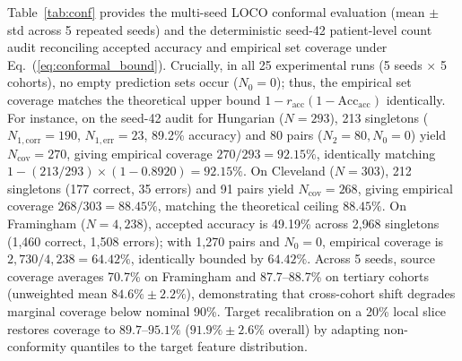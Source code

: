 \documentclass[journal]{IEEEtran}
\begin{document}
Table~\ref{tab:conf} provides the multi-seed LOCO conformal evaluation (mean $\pm$ std across 5 repeated seeds) and the deterministic seed-42 patient-level count audit reconciling accepted accuracy and empirical set coverage under Eq.~(\ref{eq:conformal_bound}). Crucially, in all 25 experimental runs (5 seeds $\times$ 5 cohorts), no empty prediction sets occur ($N_0=0$); thus, the empirical set coverage matches the theoretical upper bound $1 - r_{\mathrm{acc}}(1 - \mathrm{Acc}_{\mathrm{acc}})$ identically. For instance, on the seed-42 audit for Hungarian ($N=293$), 213 singletons ($N_{1,\mathrm{corr}}=190$, $N_{1,\mathrm{err}}=23$, 89.2\% accuracy) and 80 pairs ($N_2=80, N_0=0$) yield $N_{\mathrm{cov}}=270$, giving empirical coverage $270/293 = 92.15\%$, identically matching $1 - (213/293)\times(1-0.8920) = 92.15\%$. On Cleveland ($N=303$), 212 singletons (177 correct, 35 errors) and 91 pairs yield $N_{\mathrm{cov}}=268$, giving empirical coverage $268/303 = 88.45\%$, matching the theoretical ceiling $88.45\%$. On Framingham ($N=4{,}238$), accepted accuracy is 49.19\% across 2{,}968 singletons (1,460 correct, 1,508 errors); with 1{,}270 pairs and $N_0=0$, empirical coverage is $2{,}730/4{,}238=64.42\%$, identically bounded by $64.42\%$. Across 5 seeds, source coverage averages 70.7\% on Framingham and 87.7--88.7\% on tertiary cohorts (unweighted mean $84.6\% \pm 2.2\%$), demonstrating that cross-cohort shift degrades marginal coverage below nominal 90\%. Target recalibration on a 20\% local slice restores coverage to $89.7$--$95.1\%$ ($91.9\% \pm 2.6\%$ overall) by adapting non-conformity quantiles to the target feature distribution.
\end{document}
